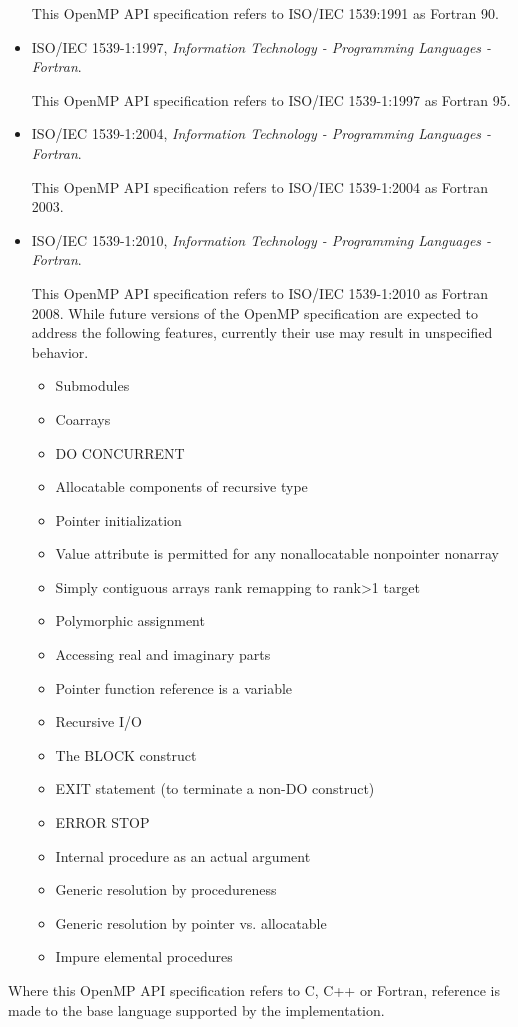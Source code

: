 \begin{itemize}
This OpenMP API specification refers to ISO/IEC 1539:1991 as Fortran 90.

\item ISO/IEC 1539-1:1997, \textsl{Information Technology - Programming Languages - Fortran}.

This OpenMP API specification refers to ISO/IEC 1539-1:1997 as Fortran 95.

\item ISO/IEC 1539-1:2004, \textsl{Information Technology - Programming Languages - Fortran}.

This OpenMP API specification refers to ISO/IEC 1539-1:2004 as Fortran 2003.

\item ISO/IEC 1539-1:2010, \textsl{Information Technology - Programming Languages - Fortran}.

This OpenMP API specification refers to ISO/IEC 1539-1:2010 as Fortran 2008. 
While future versions of the OpenMP specification are expected to
address the following features, currently their use may result in
unspecified behavior.

\begin{itemize}
\item Submodules
\item Coarrays
\item DO CONCURRENT
\item Allocatable components of recursive type
\item Pointer initialization
\item Value attribute is permitted for any nonallocatable nonpointer nonarray
\item Simply contiguous arrays rank remapping to rank>1 target
\item Polymorphic assignment
\item Accessing real and imaginary parts
\item Pointer function reference is a variable
\item Recursive I/O
\item The BLOCK construct
\item EXIT statement (to terminate a non-DO construct)
\item ERROR STOP
\item Internal procedure as an actual argument
\item Generic resolution by procedureness
\item Generic resolution by pointer vs. allocatable
\item Impure elemental procedures
\end{itemize}

\end{itemize}

Where this OpenMP API specification refers to C, C++ or Fortran, reference is made to
the base language supported by the implementation.

